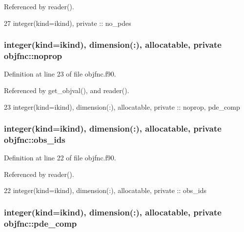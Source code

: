 Referenced by reader().


\begin{DoxyCode}
27   \textcolor{keywordtype}{integer(kind=ikind)}, \textcolor{keywordtype}{private} ::  no\_pdes
\end{DoxyCode}
\subsubsection[{noprop}]{\setlength{\rightskip}{0pt plus 5cm}integer(kind=ikind), dimension(\+:), allocatable, private objfnc\+::noprop\hspace{0.3cm}{\ttfamily [private]}}\label{namespaceobjfnc_a77131f874ccc4d3cefcae2947d1cb4e7}


Definition at line 23 of file objfnc.\+f90.



Referenced by get\+\_\+objval(), and reader().


\begin{DoxyCode}
23   \textcolor{keywordtype}{integer(kind=ikind)}, \textcolor{keywordtype}{dimension(:)}, \textcolor{keywordtype}{allocatable}, \textcolor{keywordtype}{private} :: noprop, pde\_comp
\end{DoxyCode}
\subsubsection[{obs\+\_\+ids}]{\setlength{\rightskip}{0pt plus 5cm}integer(kind=ikind), dimension(\+:), allocatable, private objfnc\+::obs\+\_\+ids\hspace{0.3cm}{\ttfamily [private]}}\label{namespaceobjfnc_abecd874fad6a0eee4d9145b4850ef3c8}


Definition at line 22 of file objfnc.\+f90.



Referenced by reader().


\begin{DoxyCode}
22   \textcolor{keywordtype}{integer(kind=ikind)}, \textcolor{keywordtype}{dimension(:)}, \textcolor{keywordtype}{allocatable}, \textcolor{keywordtype}{private} :: obs\_ids
\end{DoxyCode}
\subsubsection[{pde\+\_\+comp}]{\setlength{\rightskip}{0pt plus 5cm}integer(kind=ikind), dimension(\+:), allocatable, private objfnc\+::pde\+\_\+comp\hspace{0.3cm}{\ttfamily [private]}}\label{namespaceobjfnc_ac1c6d931e040f0b4a43a2cdfd280b10d}


